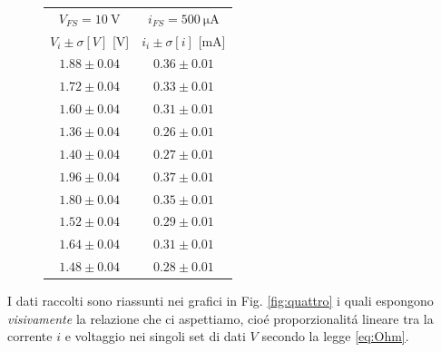 \documentclass{article}
\begin{document}
\begin{figure}
\begin{multicols}{2}
\begin{center}
\begin{tabular}{c|c} 
$V_{FS}=\SI{10}{\volt}$&$i_{FS}=\SI{500}{\micro\ampere}$\\
$V_i \pm \sigma [V]$ [\si{\volt}] & $i_i \pm \sigma [i]$ [\si{\milli\ampere}]\\
[0.5ex]
\hline
$1.88 \pm 0.04 $&$0.36 \pm 0.01$\\

$1.72 \pm 0.04 $&$0.33 \pm 0.01$\\

$1.60 \pm 0.04 $&$0.31 \pm 0.01$\\

$1.36 \pm 0.04 $&$0.26 \pm 0.01$\\

$1.40 \pm 0.04 $&$0.27 \pm 0.01$\\

$1.96 \pm 0.04 $&$0.37 \pm 0.01$\\

$1.80 \pm 0.04 $&$0.35 \pm 0.01$\\

$1.52 \pm 0.04 $&$0.29 \pm 0.01$\\

$1.64 \pm 0.04 $&$0.31 \pm 0.01$\\

$1.48 \pm 0.04 $&$0.28 \pm 0.01$\\

\end{tabular}
\end{center}
\end{multicols}
\end{figure}

\newpage
I dati raccolti sono riassunti nei grafici in Fig. \ref{fig:quattro} i quali espongono \textit{visivamente} la relazione che ci aspettiamo, cio\'e proporzionalit\'a lineare tra la corrente $i$ e voltaggio nei singoli set di dati $V$ secondo la legge \ref{eq:Ohm}.\\
\end{document}
